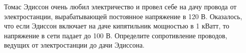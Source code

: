 Томас Эдиссон очень любил электричество и провел себе на дачу провода от электростанции, вырабатывающей постоянное напряжение в 120 В. Оказалось, что если Эдиссон включает на даче кипятильник мощностью в 1 кВатт, то напряжение в сети падает до 100 В. Определите сопротивление проводов, ведущих от электростанции до дачи Эдиссона.